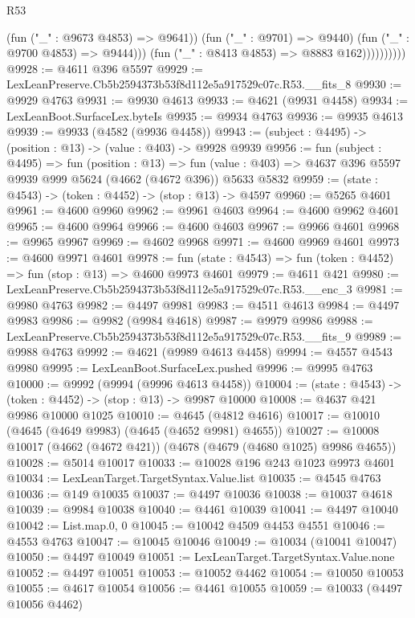 \begin{lexlean}{R53}
\begin{coremodule}
                            (fun ("_" : @9673 @4853) => @9641))
                          (fun ("_" : @9701) => @9440)
                          (fun ("_" : @9700 @4853) => @9444)))
                      (fun ("_" : @8413 @4853) => @8883 @162))))))))))
@9928 := @4611 @396 @5597
@9929 := LexLeanPreserve.Cb5b2594373b53f8d112e5a917529c07c.R53.__fits_8
@9930 := @9929 @4763
@9931 := @9930 @4613
@9933 := @4621 (@9931 @4458)
@9934 := LexLeanBoot.SurfaceLex.byteIs
@9935 := @9934 @4763
@9936 := @9935 @4613
@9939 := @9933 (@4582 (@9936 @4458))
@9943 := (subject : @4495) -> (position : @13) -> (value : @403) -> @9928 @9939
@9956 := fun (subject : @4495) =>
  fun (position : @13) =>
  fun (value : @403) => @4637 @396 @5597 @9939 @999 @5624 (@4662 (@4672 @396)) @5633 @5832
@9959 := (state : @4543) -> (token : @4452) -> (stop : @13) -> @4597
@9960 := @5265 @4601
@9961 := @4600 @9960
@9962 := @9961 @4603
@9964 := @4600 @9962 @4601
@9965 := @4600 @9964
@9966 := @4600 @4603
@9967 := @9966 @4601
@9968 := @9965 @9967
@9969 := @4602 @9968
@9971 := @4600 @9969 @4601
@9973 := @4600 @9971 @4601
@9978 := fun (state : @4543) => fun (token : @4452) => fun (stop : @13) => @4600 @9973 @4601
@9979 := @4611 @421
@9980 := LexLeanPreserve.Cb5b2594373b53f8d112e5a917529c07c.R53.__enc_3
@9981 := @9980 @4763
@9982 := @4497 @9981
@9983 := @4511 @4613
@9984 := @4497 @9983
@9986 := @9982 (@9984 @4618)
@9987 := @9979 @9986
@9988 := LexLeanPreserve.Cb5b2594373b53f8d112e5a917529c07c.R53.__fits_9
@9989 := @9988 @4763
@9992 := @4621 (@9989 @4613 @4458)
@9994 := @4557 @4543 @9980
@9995 := LexLeanBoot.SurfaceLex.pushed
@9996 := @9995 @4763
@10000 := @9992 (@9994 (@9996 @4613 @4458))
@10004 := (state : @4543) -> (token : @4452) -> (stop : @13) -> @9987 @10000
@10008 := @4637 @421 @9986 @10000 @1025
@10010 := @4645 (@4812 @4616)
@10017 := @10010 (@4645 (@4649 @9983) (@4645 (@4652 @9981) @4655))
@10027 := @10008 @10017 (@4662 (@4672 @421)) (@4678 (@4679 (@4680 @1025) @9986 @4655))
@10028 := @5014 @10017
@10033 := @10028 @196 @243 @1023 @9973 @4601
@10034 := LexLeanTarget.TargetSyntax.Value.list
@10035 := @4545 @4763
@10036 := @149 @10035
@10037 := @4497 @10036
@10038 := @10037 @4618
@10039 := @9984 @10038
@10040 := @4461 @10039
@10041 := @4497 @10040
@10042 := List.map.{0, 0}
@10045 := @10042 @4509 @4453 @4551
@10046 := @4553 @4763
@10047 := @10045 @10046
@10049 := @10034 (@10041 @10047)
@10050 := @4497 @10049
@10051 := LexLeanTarget.TargetSyntax.Value.none
@10052 := @4497 @10051
@10053 := @10052 @4462
@10054 := @10050 @10053
@10055 := @4617 @10054
@10056 := @4461 @10055
@10059 := @10033 (@4497 @10056 @4462)

\end{coremodule}
\end{lexlean}
